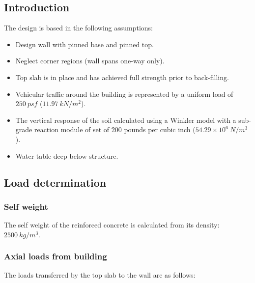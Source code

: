 \subsection{Introduction}

The design is based in the following assumptions:

\begin{itemize}
\item Design wall with pinned base and pinned top.
\item Neglect corner regions (wall spans one-way only).
\item Top slab is in place and has achieved full strength prior to back-filling.
\item Vehicular traffic around the building is represented by a uniform load of $250\ psf$ ($11.97\ kN/m^2$).
\item The vertical response of the soil calculated using a Winkler model with a sub-grade reaction module of set of 200 pounds per cubic inch ($54.29 \times 10^6\ N/m^3$).
\item Water table deep below structure.
\end{itemize}

\subsection{Load determination}

\subsubsection{Self weight}
The self weight of the reinforced concrete is calculated from its density: $2500\ kg/m^3$.

\subsubsection{Axial loads from building}
The loads transferred by the top slab to the wall are as follows:

